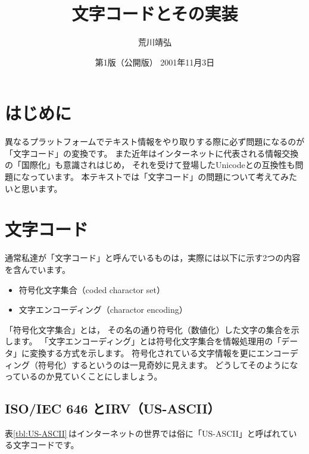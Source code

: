 \documentclass[a4j,10pt,fleqn,uplatex]{jsarticle}
\title{\textbf{文字コードとその実装}}
\author{荒川靖弘}
\date{第1版（公開版） 2001年11月3日}
\begin{document}
\maketitle

\tableofcontents


\clearpage
\section{はじめに}

異なるプラットフォームでテキスト情報をやり取りする際に必ず問題になるのが
「文字コード」の変換です。
また近年はインターネットに代表される情報交換の「国際化」も意識されはじめ，
それを受けて登場したUnicodeとの互換性も問題になっています。
本テキストでは「文字コード」の問題について考えてみたいと思います。


\section{文字コード}

通常私達が「文字コード」と呼んでいるものは，実際には以下に示す2つの内容を含んでいます。
\begin{itemize}
\item 符号化文字集合（coded charactor set）
\item 文字エンコーディング（charactor encoding）
\end{itemize}
「符号化文字集合」とは，
その名の通り符号化（数値化）した文字の集合を示します。
「文字エンコーディング」とは符号化文字集合を情報処理用の「データ」に変換する方式を示します。
符号化されている文字情報を更にエンコーディング（符号化）するというのは一見奇妙に見えます。
どうしてそのようになっているのか見ていくことにしましょう。

\subsection{ISO/IEC 646 とIRV（US-ASCII）}

表\ref{tbl:US-ASCII}\,はインターネットの世界では俗に「US-ASCII」と呼ばれている文字コードです。
\end{document}
